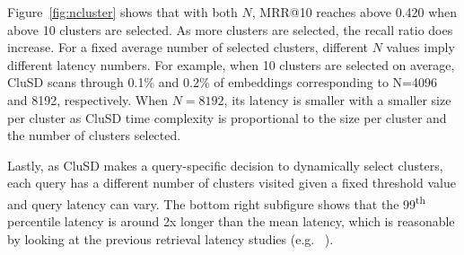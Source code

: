 Figure~\ref{fig:ncluster} shows that with both $N$,
MRR@10 reaches above 0.420 when above 10 clusters 
are selected.
As more clusters are selected,  the recall ratio does  increase. 
For  a fixed average number of selected clusters, 
different $N$ values imply different latency numbers.
For example, when 10 clusters are selected on average, 
CluSD  scans through 0.1\% and  0.2\% of embeddings corresponding to N=4096 and 8192, respectively. 
When $N= 8192$, its latency 
is smaller  with a  smaller size per cluster
as CluSD time complexity is proportional  to  the size per cluster and the number of clusters selected.

Lastly, as CluSD makes a query-specific decision to dynamically select  clusters, each query has  a  different number of clusters visited
given a fixed threshold value and query latency can vary. 
The bottom right subfigure shows that the 99\textsuperscript{th}
percentile latency is around 2x longer than the mean latency, which is reasonable by
looking at the previous retrieval latency studies (e.g. ~\cite{mallia2019pisa, 2022ACMTransAnytime}).





